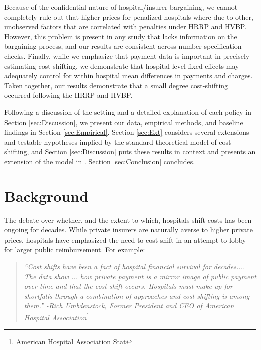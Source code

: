\documentclass[12pt]{article}
\begin{document}
Because of the confidential nature of hospital/insurer bargaining, we cannot completely rule out that higher prices for penalized hospitals where due to other, unobserved factors that are correlated with penalties under HRRP and HVBP.  However, this problem is present in any study that lacks information on the bargaining process, and our results are consistent across number specification checks. 
Finally, while we emphasize that payment data is important in precisely estimating cost-shifting, we demonstrate that hospital level fixed effects may adequately control for within hospital mean differences in payments and charges.  Taken together, our results demonstrate that a small degree cost-shifting occurred following the HRRP and HVBP.   

Following a discussion of the setting and a detailed explanation of each policy in Section \ref{sec:Discussion}, we present our data, empirical methods, and baseline findings in Section \ref{sec:Empirical}. Section \ref{sec:Ext} considers several extensions and testable hypotheses implied by the standard theoretical model of cost-shifting, and Section \ref{sec:Discussion} puts these results in context and presents an extension of the model in \cite{dranove1988}.  Section \ref{sec:Conclusion} concludes.

\section{Background}
\label{sec:Background}

The debate over whether, and the extent to which, hospitals shift costs has been ongoing for decades. While private insurers are naturally averse to higher private prices, hospitals have emphasized the need to cost-shift in an attempt to lobby for larger public reimbursement. For example:
\begin{quote}
\textit{``Cost shifts have been a fact of hospital financial survival for decades.... The data show ...  how private payment is a mirror image of public payment over time and that the cost shift occurs. Hospitals must make up for shortfalls through a combination of approaches and cost-shifting is among them.'' -Rich Umbdenstock, Former President and CEO of American Hospital Association}\footnote{\href{$http://blog.aha.org/post/costshifting-in-hospitals-$}{American Hospital Association Stat}}
\end{quote}
\end{document}
